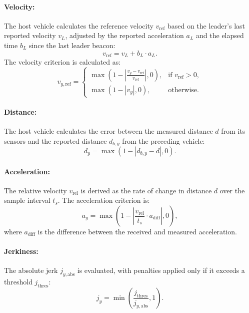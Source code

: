 \documentclass[letterpaper, 10pt, conference]{ieeeconf}  %
\begin{document}
\paragraph{Velocity:} The host vehicle calculates the reference velocity $v_\text{ref}$ based on the leader’s last reported velocity $v_L$, adjusted by the reported acceleration $a_L$ and the elapsed time $b_L$ since the last leader beacon:
\begin{equation}
    v_\text{ref} = v_L + b_L \cdot a_L.
\end{equation}
The velocity criterion is calculated as:
\begin{equation}
    v_{y,\text{ref}} = 
    \begin{cases} 
        \max\left(1 - \left|\frac{v_y - v_\text{ref}}{v_\text{ref}}\right|, 0\right), & \text{if } v_\text{ref} > 0, \\
        \max\left(1 - |v_y|, 0\right), & \text{otherwise}.
    \end{cases}
\end{equation}

\paragraph{Distance:} The host vehicle calculates the error between the measured distance $d$ from its sensors and the reported distance $d_{b,y}$ from the preceding vehicle:
\begin{equation}
    d_y = \max\left(1 - \left|d_{b,y} - d\right|, 0\right).
\end{equation}

\paragraph{Acceleration:} The relative velocity $v_\text{rel}$ is derived as the rate of change in distance $d$ over the sample interval $t_s$. The acceleration criterion is:
\begin{equation}
    a_y = \max\left(1 - \left|\frac{v_\text{rel}}{t_s} \cdot a_\text{diff}\right|, 0\right),
\end{equation}
where $a_\text{diff}$ is the difference between the received and measured acceleration.

\paragraph{Jerkiness:} The absolute jerk $j_{y,\text{abs}}$ is evaluated, with penalties applied only if it exceeds a threshold $j_\text{thres}$:
\begin{equation}
    j_y = \min\left(\frac{j_\text{thres}}{j_{y,\text{abs}}}, 1\right).
\end{equation}
\end{document}
